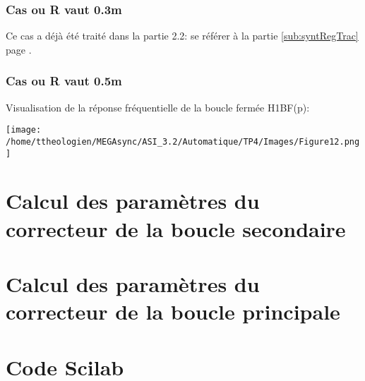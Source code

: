 \documentclass[a4paper,12pt]{article}
\begin{document}
			\subsubsection{Cas ou R vaut 0.3m}
				\par Ce cas a déjà été traité dans la partie 2.2: se référer à la partie \ref{sub:syntRegTrac} page \pageref{sub:syntRegTrac}.
				\pagebreak

			\subsubsection{Cas ou R vaut 0.5m}
				\par Visualisation de la réponse fréquentielle de la boucle fermée H1BF(p):
				\begin{center}
					\texttt{[image: /home/ttheologien/MEGAsync/ASI\_3.2/Automatique/TP4/Images/Figure12.png]}
				\end{center}
				\pagebreak

	\appendix
		\section{Calcul des paramètres du correcteur de la boucle secondaire}
		\label{sec:CalcParamCorH2}
		\newpage

		\section{Calcul des paramètres du correcteur de la boucle principale}
		\label{sec:CalcParamCorH1}
		\newpage

		\section{Code Scilab}
			\begin{center}
				
				
				
			\end{center}
\end{document}
